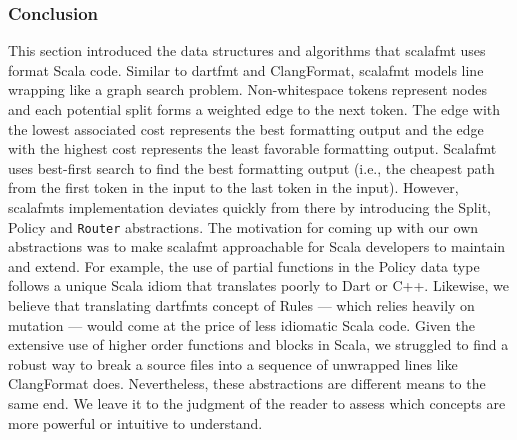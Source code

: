 \subsubsection{Conclusion}
This section introduced the data structures and algorithms that scalafmt uses format Scala code.
Similar to dartfmt and ClangFormat, scalafmt models line wrapping like a graph search problem.
Non-whitespace tokens represent nodes and each potential split forms a weighted edge to the next token.
The edge with the lowest associated cost represents the best formatting output and the edge with the highest cost represents the least favorable formatting output.
Scalafmt uses best-first search to find the best formatting output (i.e., the cheapest path from the first token in the input to the last token in the input).
However, scalafmts implementation deviates quickly from there by introducing the Split, Policy and \texttt{Router} abstractions.
The motivation for coming up with our own abstractions was to make scalafmt approachable for Scala developers to maintain and extend.
For example, the use of partial functions in the Policy data type follows a unique Scala idiom that translates poorly to Dart or C++.
Likewise, we believe that translating dartfmts concept of Rules --- which relies heavily on mutation --- would come at the price of less idiomatic Scala code.
Given the extensive use of higher order functions and blocks in Scala, we struggled to find a robust way to break a source files into a sequence of unwrapped lines like ClangFormat does.
Nevertheless, these abstractions are different means to the same end.
We leave it to the judgment of the reader to assess which concepts are more powerful or intuitive to understand.
